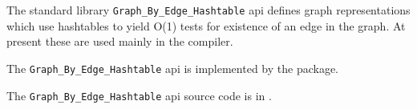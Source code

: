 
The standard library {\tt Graph\_By\_Edge\_Hashtable} api defines graph representations which use hashtables to yield O(1) tests for existence of an edge in the graph.
At present these are used mainly in the compiler.

The {\tt Graph\_By\_Edge\_Hashtable} api is implemented by the  package.

The {\tt Graph\_By\_Edge\_Hashtable} api source code is in .






